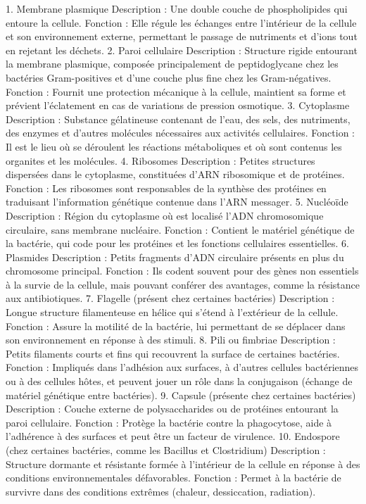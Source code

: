1. Membrane plasmique
Description : Une double couche de phospholipides qui entoure la cellule.
Fonction : Elle régule les échanges entre l'intérieur de la cellule et son environnement externe, permettant le passage de nutriments et d'ions tout en rejetant les déchets.
2. Paroi cellulaire
Description : Structure rigide entourant la membrane plasmique, composée principalement de peptidoglycane chez les bactéries Gram-positives et d'une couche plus fine chez les Gram-négatives.
Fonction : Fournit une protection mécanique à la cellule, maintient sa forme et prévient l'éclatement en cas de variations de pression osmotique.
3. Cytoplasme
Description : Substance gélatineuse contenant de l'eau, des sels, des nutriments, des enzymes et d'autres molécules nécessaires aux activités cellulaires.
Fonction : Il est le lieu où se déroulent les réactions métaboliques et où sont contenus les organites et les molécules.
4. Ribosomes
Description : Petites structures dispersées dans le cytoplasme, constituées d'ARN ribosomique et de protéines.
Fonction : Les ribosomes sont responsables de la synthèse des protéines en traduisant l'information génétique contenue dans l'ARN messager.
5. Nucléoïde
Description : Région du cytoplasme où est localisé l'ADN chromosomique circulaire, sans membrane nucléaire.
Fonction : Contient le matériel génétique de la bactérie, qui code pour les protéines et les fonctions cellulaires essentielles.
6. Plasmides
Description : Petits fragments d'ADN circulaire présents en plus du chromosome principal.
Fonction : Ils codent souvent pour des gènes non essentiels à la survie de la cellule, mais pouvant conférer des avantages, comme la résistance aux antibiotiques.
7. Flagelle (présent chez certaines bactéries)
Description : Longue structure filamenteuse en hélice qui s'étend à l'extérieur de la cellule.
Fonction : Assure la motilité de la bactérie, lui permettant de se déplacer dans son environnement en réponse à des stimuli.
8. Pili ou fimbriae
Description : Petits filaments courts et fins qui recouvrent la surface de certaines bactéries.
Fonction : Impliqués dans l'adhésion aux surfaces, à d'autres cellules bactériennes ou à des cellules hôtes, et peuvent jouer un rôle dans la conjugaison (échange de matériel génétique entre bactéries).
9. Capsule (présente chez certaines bactéries)
Description : Couche externe de polysaccharides ou de protéines entourant la paroi cellulaire.
Fonction : Protège la bactérie contre la phagocytose, aide à l'adhérence à des surfaces et peut être un facteur de virulence.
10. Endospore (chez certaines bactéries, comme les Bacillus et Clostridium)
Description : Structure dormante et résistante formée à l'intérieur de la cellule en réponse à des conditions environnementales défavorables.
Fonction : Permet à la bactérie de survivre dans des conditions extrêmes (chaleur, dessiccation, radiation).


